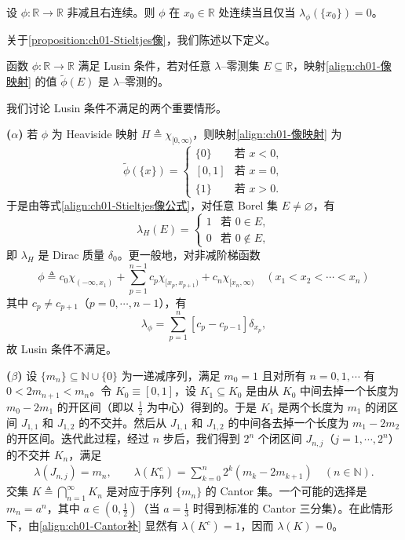 \documentclass[../../main.tex]{subfiles}%
\begin{document}
\begin{corollary}\label{corollary:ch01-Stieltjes连续}
设 $\phi:\mathbb{R}\to\mathbb{R}$ 非减且右连续。则 $\phi$ 在 $x_0\in\mathbb{R}$ 处连续当且仅当 $\lambda_\phi(\{x_0\})=0$。
\end{corollary}

关于\cref{proposition:ch01-Stieltjes像}，我们陈述以下定义。

\begin{definition}\label{definition:ch01-Lusin条件}
函数 $\phi:\mathbb{R}\to\mathbb{R}$ 满足 Lusin 条件，若对任意 $\lambda$--零测集 $E\subseteq\mathbb{R}$，映射\eqref{align:ch01-像映射} 的值 $\widetilde{\phi}(E)$ 是 $\lambda$--零测的。
\end{definition}

我们讨论 Lusin 条件不满足的两个重要情形。

\textbf{($\alpha$)} 若 $\phi$ 为 Heaviside 映射 $H\triangleq \chi_{[0,\infty)}$，则映射\eqref{align:ch01-像映射} 为
\[
\widetilde{\phi}(\{x\})=
\begin{cases}
\{0\} & \text{若 }x<0,\\
[0,1] & \text{若 }x=0,\\
\{1\} & \text{若 }x>0.
\end{cases}
\]
于是由等式\eqref{align:ch01-Stieltjes像公式}，对任意 Borel 集 $E\neq\varnothing $，有
\[
\lambda_H(E)=
\begin{cases}
1 & \text{若 }0\in E,\\
0 & \text{若 }0\notin E,
\end{cases}
\]
即 $\lambda_H$ 是 Dirac 质量 $\delta_0$。更一般地，对非减阶梯函数
\[
\phi\triangleq c_0\chi_{(-\infty,x_1)}+\sum_{p=1}^{n-1}c_p\chi_{[x_p,x_{p+1})}+c_n\chi_{[x_n,\infty)}\quad(x_1<x_2<\cdots<x_n)
\]
其中 $c_p\neq c_{p+1}$（$p=0,\cdots ,n-1$），有
\[
\lambda_\phi=\sum_{p=1}^n[c_p-c_{p-1}]\delta_{x_p},
\]
故 Lusin 条件不满足。

\textbf{($\beta$)} 设 $\{m_n\}\subseteq\mathbb{N}\cup\{0\}$ 为一递减序列，满足 $m_0=1$ 且对所有 $n=0,1,\cdots $ 有 $0<2m_{n+1}<m_n$。令 $K_0\equiv[0,1]$，设 $K_1\subseteq K_0$ 是由从 $K_0$ 中间去掉一个长度为 $m_0-2m_1$ 的开区间（即以 $\frac{1}{2}$ 为中心）得到的。于是 $K_1$ 是两个长度为 $m_1$ 的闭区间 $J_{1,1}$ 和 $J_{1,2}$ 的不交并。然后从 $J_{1,1}$ 和 $J_{1,2}$ 的中间各去掉一个长度为 $m_1-2m_2$ 的开区间。迭代此过程，经过 $n$ 步后，我们得到 $2^n$ 个闭区间 $J_{n,j}$（$j=1,\cdots ,2^n$）的不交并 $K_n$，满足
\begin{align}
\lambda(J_{n,j})=m_n,\qquad
\lambda(K_n^c)=\sum_{k=0}^n 2^k(m_k-2m_{k+1}) \quad(n\in\mathbb{N}). \label{align:ch01-Cantor补}
\end{align}
交集 $K\triangleq \bigcap_{n=1}^\infty K_n$ 是对应于序列 $\{m_n\}$ 的 Cantor 集。一个可能的选择是 $m_n=a^n$，其中 $a\in(0,\frac{1}{2})$（当 $a=\frac{1}{3}$ 时得到标准的 Cantor 三分集）。在此情形下，由\eqref{align:ch01-Cantor补} 显然有 $\lambda(K^c)=1$，因而 $\lambda(K)=0$。
\end{document}
